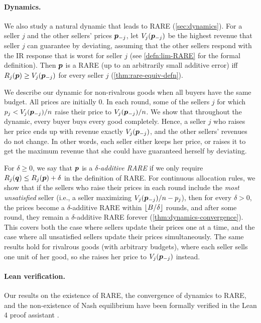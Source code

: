 \paragraph{Dynamics.}
We also study a natural dynamic that leads to RARE (\cref{sec:dynamics}).
For a seller $j$ and the other sellers' prices $\bm{p}_{-j}$,
let $V_j(\bm{p}_{-j})$ be the highest revenue that seller $j$ can guarantee by deviating,
assuming that the other sellers respond with the IR response that is worst for seller $j$
(see \cref{defn:lim-RARE} for the formal definition).
Then $\bm{p}$ is a RARE (up to an arbitrarily small additive error)
iff $R_j(\bm{p}) \ge V_j(\bm{p}_{-j})$ for every seller $j$ (\cref{thm:rare-equiv-defn}).

We describe our dynamic for non-rivalrous goods when all buyers have the same budget.
All prices are initially 0.
In each round, some of the sellers $j$ for which $p_j < V_j(\bm{p}_{-j})/n$
raise their price to $V_j(\bm{p}_{-j})/n$.
We show that throughout the dynamic, every buyer buys every good completely.
Hence, a seller $j$ who raises her price ends up with revenue exactly $V_j(\bm{p}_{-j})$,
and the other sellers' revenues do not change.
In other words, each seller either keeps her price,
or raises it to get the maximum revenue that she could have guaranteed herself by deviating.

For $\delta \ge 0$, we say that $\bm{p}$ is a \emph{$\delta$-additive RARE}
if we only require $R_j(\bm{q}) \le R_j(\bm{p}) + \delta$ in the definition of RARE.
For continuous allocation rules, we show that if the sellers who raise their prices in each round
include the \emph{most unsatisfied} seller (i.e., a seller maximizing $V_j(\bm{p}_{-j})/n - p_j$),
then for every $\delta > 0$, the prices become a $\delta$-additive RARE within $\lfloor B/\delta \rfloor$ rounds,
and after some round, they remain a $\delta$-additive RARE forever
(\cref{thm:dynamics-convergence}).
This covers both the case where sellers update their prices one at a time,
and the case where all unsatisfied sellers update their prices simultaneously.
The same results hold for rivalrous goods (with arbitrary budgets),
where each seller sells one unit of her good, so she raises her price to $V_j(\bm{p}_{-j})$ instead.

\paragraph{Lean verification.}
Our results on the existence of RARE, the convergence of dynamics to RARE,
and the non-existence of Nash equilibrium
have been formally verified in the Lean 4 proof assistant \cite{eklavya2026lean}.

